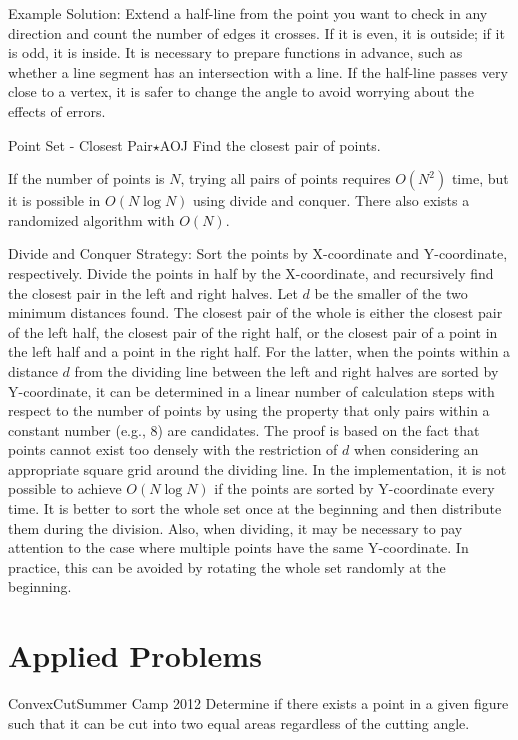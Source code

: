 Example Solution: Extend a half-line from the point you want to check in any direction and count the number of edges it crosses. If it is even, it is outside; if it is odd, it is inside. It is necessary to prepare functions in advance, such as whether a line segment has an intersection with a line. If the half-line passes very close to a vertex, it is safer to change the angle to avoid worrying about the effects of errors.

\begin{pbox}{Point Set - Closest Pair$\star$}{AOJ}
Find the closest pair of points.

\end{pbox}

If the number of points is $N$, trying all pairs of points requires $O(N^2)$ time, but it is possible in $O(N\log N)$ using divide and conquer. There also exists a randomized algorithm with $O(N)$.

Divide and Conquer Strategy: Sort the points by X-coordinate and Y-coordinate, respectively. Divide the points in half by the X-coordinate, and recursively find the closest pair in the left and right halves. Let $d$ be the smaller of the two minimum distances found. The closest pair of the whole is either the closest pair of the left half, the closest pair of the right half, or the closest pair of a point in the left half and a point in the right half. For the latter, when the points within a distance $d$ from the dividing line between the left and right halves are sorted by Y-coordinate, it can be determined in a linear number of calculation steps with respect to the number of points by using the property that only pairs within a constant number (e.g., 8) are candidates. The proof is based on the fact that points cannot exist too densely with the restriction of $d$ when considering an appropriate square grid around the dividing line. In the implementation, it is not possible to achieve $O(N\log N)$ if the points are sorted by Y-coordinate every time. It is better to sort the whole set once at the beginning and then distribute them during the division. Also, when dividing, it may be necessary to pay attention to the case where multiple points have the same Y-coordinate. In practice, this can be avoided by rotating the whole set randomly at the beginning.
\section{Applied Problems}

\begin{pbox}{ConvexCut}{Summer Camp 2012}
Determine if there exists a point in a given figure such that it can be cut into two equal areas regardless of the cutting angle.

\end{pbox}

